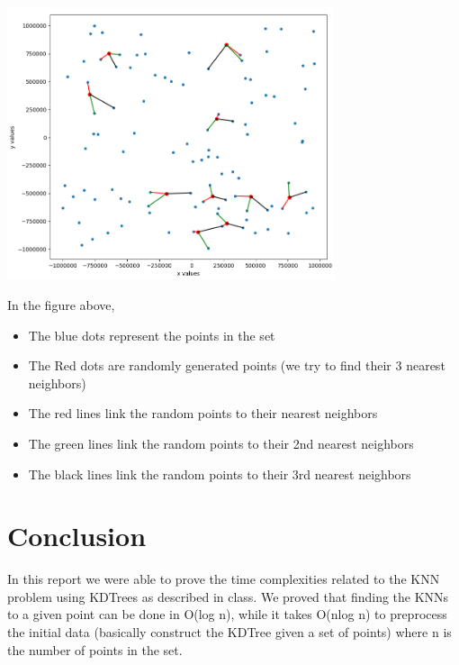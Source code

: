 \documentclass[]{article}
\begin{document}
 		{\centering
 			\includegraphics[width=\textwidth, height=8cm,keepaspectratio]{n_visual.png}
 			
 			\par}
 		
 		In the figure above,
 		\begin{itemize}
 			\item The blue dots represent the points in the set
 			\item The Red dots are randomly generated points (we try to find their 3 nearest neighbors)
 			\item The red lines link the random points to their nearest neighbors
 			\item The green lines link the random points to their 2nd nearest neighbors
 			\item The black lines link the random points to their 3rd nearest neighbors
 		\end{itemize}
 \section{Conclusion}
 	In this report we were able to prove the time complexities related to the KNN problem using KDTrees as described in class. We proved that finding the KNNs to a given point can be done in O(log n), while it takes O(nlog n) to preprocess the initial data (basically construct the KDTree given a set of points) where n is the number of points in the set.
\end{document}
